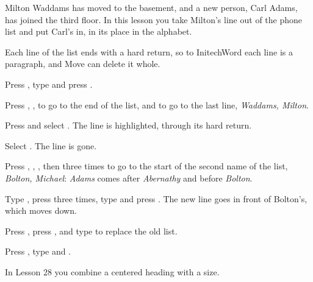 Milton Waddams has moved to the basement, and a new person, Carl Adams, has
joined the third floor.  In this lesson you take Milton's line out of the
phone list and put Carl's in, in its place in the alphabet.

Each line of the list ends with a hard return, so to InitechWord each line is
a paragraph, and Move can delete it whole.
\begin{WPSteps}
\item Press , type  and press
.
\item Press , ,  to go to the end
of the list, and  to go to the last line, \textit{Waddams,
Milton}.
\item Press  and select .  The line
is highlighted, through its hard return.
\end{WPSteps}
\begin{WPSteps}[resume]
\item Select .  The line is gone.
\end{WPSteps}

\begin{WPSteps}
\item Press , , , then
 three times to go to the start of the second
name of the list, \textit{Bolton, Michael}: \textit{Adams} comes after
\textit{Abernathy} and before \textit{Bolton}.
\item Type , press  three
times, type  and press .  The new
line goes in front of Bolton's, which moves down.
\end{WPSteps}

\begin{WPSteps}
\item Press , press , and type
 to replace the old list.
\item Press , type  and .
\end{WPSteps}
\EndReplay
In Lesson 28 you combine a centered heading with a size.
